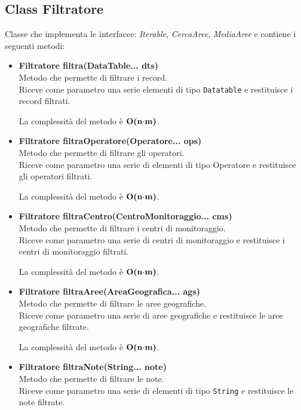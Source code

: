 \documentclass[a4paper, 12pt]{scrreprt}
\begin{document}
			\subsection{Class Filtratore}
			Classe che implementa le interfacce: \textsl{Iterable}, \textsl{CercaAree}, \textsl{MediaAree} e contiene i seguenti metodi:
			\begin{itemize}
				\item \textbf{Filtratore filtra(DataTable... dts)}
				\\Metodo che permette di filtrare i record.
				\\Riceve come parametro una serie elementi di tipo \verb!Datatable! e restituisce i record filtrati.

				La complessit\`a del metodo \`e $\mathbf{O}\textbf{(n$\cdot$m)}$.

				\item \textbf{Filtratore filtraOperatore(Operatore... ops)}
				\\Metodo che permette di filtrare gli operatori.
				\\Riceve come parametro una serie di elementi di tipo Operatore e restituisce gli operatori filtrati.

				La complessit\`a del metodo \`e $\mathbf{O}\textbf{(n$\cdot$m)}$.

				\pagebreak
				\item \textbf{Filtratore filtraCentro(CentroMonitoraggio... cms)}
				\\Metodo che permette di filtrare i centri di monitoraggio.
				\\Riceve come parametro una serie di centri di monitoraggio e restituisce i centri di monitoraggio filtrati.

				La complessit\`a del metodo \`e $\mathbf{O}\textbf{(n$\cdot$m)}$.

				\item \textbf{Filtratore filtraAree(AreaGeografica... ags)}
				\\Metodo che permette di filtrare le aree geografiche.
				\\Riceve come parametro una serie di aree geografiche e restituisce le aree geografiche filtrate.

				La complessit\`a del metodo \`e $\mathbf{O}\textbf{(n$\cdot$m)}$.

				\item \textbf{Filtratore filtraNote(String... note)}
				\\Metodo che permette di filtrare le note.
				\\Riceve come parametro una serie di elementi di tipo \verb!String! e restituisce le note filtrate.


\end{itemize}
\end{document}
